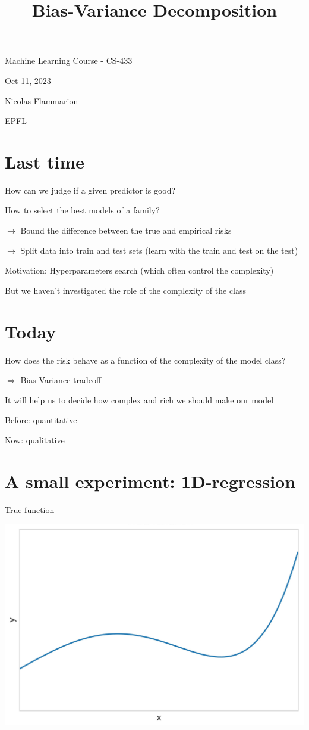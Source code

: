 \documentclass[10pt]{article}
\title{Bias-Variance Decomposition }
\author{}
\date{}
\begin{document}
\maketitle
Machine Learning Course - CS-433

Oct 11, 2023

Nicolas Flammarion

EPFL

\section*{Last time}
How can we judge if a given predictor is good?

How to select the best models of a family?

$\rightarrow$ Bound the difference between the true and empirical risks

$\rightarrow$ Split data into train and test sets (learn with the train and test on the test)

Motivation: Hyperparameters search (which often control the complexity)

But we haven't investigated the role of the complexity of the class

\section*{Today}
How does the risk behave as a function of the complexity of the model class?

$\Rightarrow$ Bias-Variance tradeoff

It will help us to decide how complex and rich we should make our model

Before: quantitative

Now: qualitative

\section*{A small experiment: 1D-regression}
True function

\begin{center}
\includegraphics[max width=\textwidth]{2023_12_30_442f876157646883c2c9g-04}
\end{center}
\end{document}

